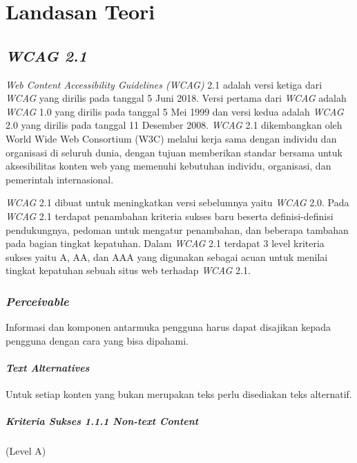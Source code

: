 \setcounter{secnumdepth}{3}

\chapter{Landasan Teori}
\label{chap:teori}

\section{\textit{WCAG 2.1}}
\label{sec:wcag_2.1} 
\textit{Web Content Accessibility Guidelines (WCAG)} 2.1 adalah versi ketiga dari \textit{WCAG} yang dirilis pada tanggal 5 Juni 2018. Versi pertama dari \textit{WCAG} adalah \textit{WCAG} 1.0 yang dirilis pada tanggal 5 Mei 1999 dan versi kedua adalah \textit{WCAG} 2.0 yang dirilis pada tanggal 11 Desember 2008. \textit{WCAG} 2.1 dikembangkan oleh World Wide Web Consortium (W3C) melalui kerja sama dengan individu dan organisasi di seluruh dunia, dengan tujuan memberikan standar bersama untuk aksesibilitas konten web yang memenuhi kebutuhan individu, organisasi, dan pemerintah internasional. 

\textit{WCAG} 2.1 dibuat untuk meningkatkan versi sebelumnya yaitu \textit{WCAG} 2.0. Pada \textit{WCAG} 2.1 terdapat penambahan kriteria sukses baru beserta definisi-definisi pendukungnya, pedoman untuk mengatur penambahan, dan beberapa tambahan pada bagian tingkat kepatuhan. Dalam \textit{WCAG} 2.1 terdapat 3 level kriteria sukses yaitu A, AA, dan AAA yang digunakan sebagai acuan untuk menilai tingkat kepatuhan sebuah situs web terhadap \textit{WCAG} 2.1.

\subsection{\textit{Perceivable}}
\label{sec:perceivable}
Informasi dan komponen antarmuka pengguna harus dapat disajikan kepada pengguna dengan cara yang bisa dipahami.

\subsubsection{\textit{Text Alternatives}}
\label{sec:text_alternatives}
Untuk setiap konten yang bukan merupakan teks perlu disediakan teks alternatif.

\paragraph{Kriteria Sukses 1.1.1 \textit{Non-text Content}}
\label{sec:kriteria_sukses_1.1.1}
(Level A)\\

